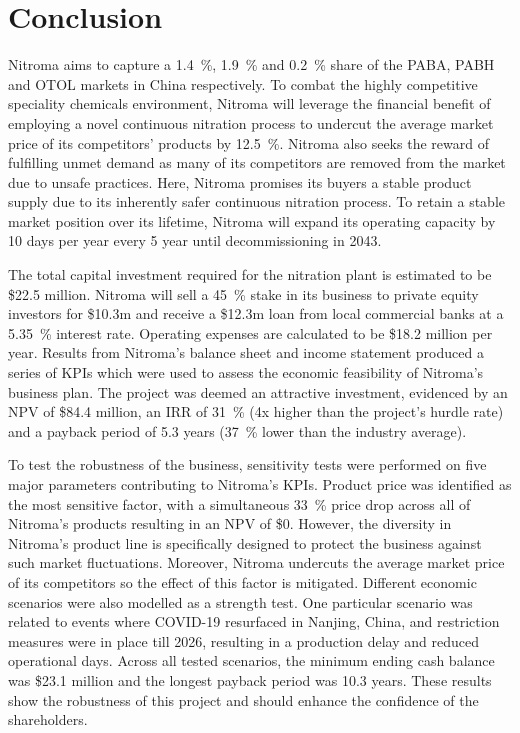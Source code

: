 \section{Conclusion}
Nitroma aims to capture a \SI{1.4}{\percent}, \SI{1.9}{\percent} and \SI{0.2}{\percent} share of the PABA, PABH and OTOL markets in China respectively. To combat the highly competitive speciality chemicals environment, Nitroma will leverage the financial benefit of employing a novel continuous nitration process to undercut the average market price of its competitors’ products by \SI{12.5}{\percent}. Nitroma also seeks the reward of fulfilling unmet demand as many of its competitors are removed from the market due to unsafe practices. Here, Nitroma promises its buyers a stable product supply due to its inherently safer continuous nitration process. To retain a stable market position over its lifetime, Nitroma will expand its operating capacity by 10 days per year every 5 year until decommissioning in 2043.

The total capital investment required for the nitration plant is estimated to be \$22.5 million. Nitroma will sell a \SI{45}{\percent} stake in its business to private equity investors for \$10.3m and receive a \$12.3m loan from local commercial banks at a \SI{5.35}{\percent} interest rate. Operating expenses are calculated to be \$18.2 million per year.  Results from Nitroma’s balance sheet and income statement produced a series of KPIs which were used to assess the economic feasibility of Nitroma’s business plan. The project was deemed an attractive investment, evidenced by an NPV of \$84.4 million, an IRR of \SI{31}{\percent} (4x higher than the project’s hurdle rate) and a payback period of 5.3 years (\SI{37}{\percent} lower than the industry average).

To test the robustness of the business, sensitivity tests were performed on five major parameters contributing to Nitroma’s KPIs. Product price was identified as the most sensitive factor, with a simultaneous \SI{33}{\percent} price drop across all of Nitroma's products resulting in an NPV of \$0. However, the diversity in Nitroma’s product line is specifically designed to protect the business against such market fluctuations. Moreover, Nitroma undercuts the average market price of its competitors so the effect of this factor is mitigated. Different economic scenarios were also modelled as a strength test. One particular scenario was related to events where COVID-19 resurfaced in Nanjing, China, and restriction measures were in place till 2026, resulting in a production delay and reduced operational days. Across all tested scenarios, the minimum ending cash balance was \$23.1 million and the longest payback period was 10.3 years. These results show the robustness of this project and should enhance the confidence of the shareholders.